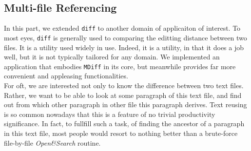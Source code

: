 \documentclass{article}
\begin{document}
\subsection{Multi-file Referencing}
In this part, we extended \texttt{diff} to another domain of applicaiton of interest. To most eyes, \texttt{diff} is generally used to comparing the editting distance between two files. It is a utility used widely in use. Indeed, it is a utility, in that it does a job well, but it is not typically tailored for any domain. We implemented an application that embodies \texttt{MDiff} in its core, but meanwhile provides far more convenient and appleasing functionalities. \\

For oft, we are interested not only to know the difference between two text files. Rather, we want to be able to look at some paragraph of this text file, and find out from which other paragraph in other file this paragraph derives. Text reusing is so common nowadays that this is a feature of no trivial productivity significance. In fact, to fullfill such a task, of finding the ancestor of a paragraph in this text file, most people would resort to nothing better than a brute-force file-by-file \textit{Open\&Search} routine. \\























\end{document}
